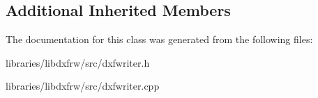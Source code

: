 \subsection*{Additional Inherited Members}


The documentation for this class was generated from the following files\-:\begin{DoxyCompactItemize}
\item 
libraries/libdxfrw/src/dxfwriter.\-h\item 
libraries/libdxfrw/src/dxfwriter.\-cpp\end{DoxyCompactItemize}
